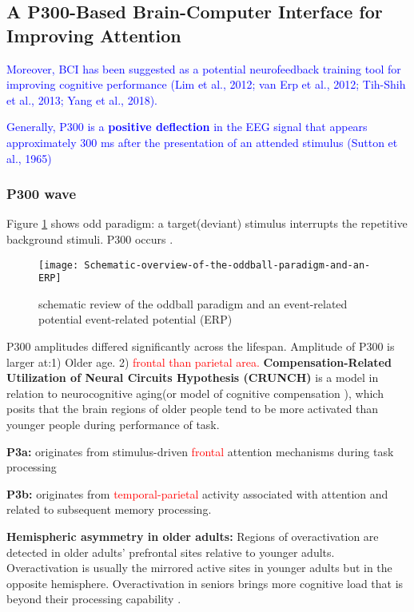\documentclass{article}
\begin{document}
\subsection{A P300-Based Brain-Computer Interface for Improving Attention}

\textcolor{blue}{Moreover, BCI has been suggested as a potential neurofeedback training tool for improving cognitive performance (Lim et al., 2012; van Erp et al., 2012; Tih-Shih et al., 2013; Yang et al., 2018).}

\textcolor{blue}{Generally, P300 is a \textbf{positive deflection} in the EEG signal that appears approximately 300 ms after the presentation of an attended stimulus (Sutton et al., 1965)}

\subsubsection{P300 wave}

Figure \ref{fig:oddball paradigm} shows odd paradigm: a target(deviant) stimulus interrupts the repetitive background stimuli. P300 occurs \cite{van_Dinteren_2014}. 

\begin{figure}[!ht]
	\texttt{[image: Schematic-overview-of-the-oddball-paradigm-and-an-ERP]}
	\centering
    \caption{schematic review of the oddball paradigm and an event-related potential event-related potential (ERP)\cite{van_Dinteren_2014}}
    \label{fig:oddball paradigm}
\end{figure}

P300 amplitudes differed significantly across the lifespan. Amplitude of P300 is larger at:1) Older age. 2) \textcolor{red}{frontal than parietal area.} \textbf{Compensation-Related Utilization of Neural Circuits Hypothesis (CRUNCH)} is a model in relation to neurocognitive aging(or model of cognitive compensation
\cite{Reuter_Lorenz_2008}), which posits that the brain regions of older people tend to be more activated than younger people during performance of task.  

\textbf{P3a:} originates from stimulus-driven \textcolor{red}{frontal} attention mechanisms during task processing

\textbf{P3b:} originates from \textcolor{red}{temporal-parietal} activity associated with attention and related to subsequent memory processing.

\textbf{Hemispheric asymmetry in older adults:} Regions of overactivation are detected in older adults' prefrontal sites relative to younger adults. Overactivation is usually the  mirrored active sites in younger adults but in the opposite hemisphere. Overactivation in seniors brings more cognitive load that is beyond their processing capability \cite{Reuter_Lorenz_2008}. 
\end{document}
